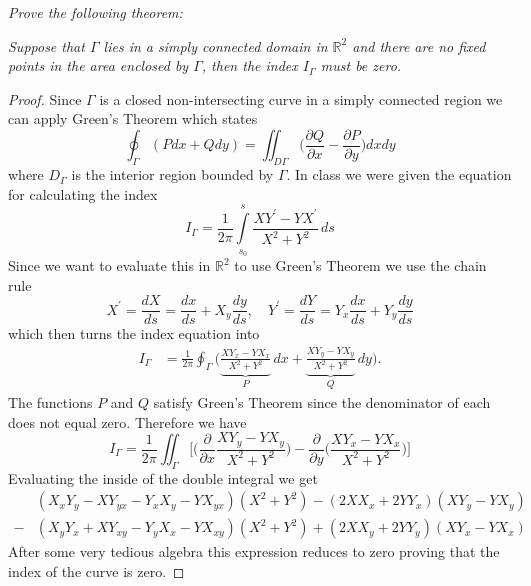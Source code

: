 \documentclass[12pt]{article}
\newcommand{\R}{\mathbb{R}}
\newenvironment{theorem}[2][]{\begin{trivlist}
\item[{\bfseries #1}\hskip \labelsep {\bfseries #2.}]}{\end{trivlist}}
\theoremstyle{remark}
\begin{document}
\textit{Prove the following theorem:}
\begin{theorem}{Theorem}
	\textit{Suppose that $\Gamma$ lies in a simply connected domain in $\R^2$ and there are no fixed points in the area enclosed by $\Gamma$, then the index $I_{\Gamma}$ must be zero.} 
\end{theorem}
\begin{proof}
Since $\Gamma$ is a closed non-intersecting curve in a simply connected region we can apply Green's Theorem which states
$$ \oint_\Gamma (P dx + Q dy) = \iint_{D\Gamma} \bigg(\frac{\partial Q}{\partial x} - \frac{\partial P}{\partial y}\bigg)dxdy $$
where $D_\Gamma$ is the interior region bounded by $\Gamma$. In class we were given the equation for calculating the index
$$ I_\Gamma = \frac{1}{2\pi}\int\limits_{s_0}^s \frac{XY^\prime - YX^\prime}{X^2 + Y^2} \, ds $$
Since we want to evaluate this in $\mathbb{R}^2$ to use Green's Theorem we use the chain rule
$$ X^\prime = \frac{dX}{ds} = \frac{dx}{ds} + X_y\frac{dy}{ds}, \quad Y^\prime = \frac{dY}{ds} = Y_x\frac{dx}{ds} + Y_y\frac{dy}{ds} $$
which then turns the index equation into
\begin{align*}
I_\Gamma & = \frac{1}{2\pi}\oint_\Gamma\bigg(\underbrace{\frac{XY_x - YX_x}{X^2 + Y^2}}_{P}\,dx + \underbrace{\frac{XY_y - YX_y}{X^2 + Y^2}}_{Q}\,dy\bigg).
\end{align*}
The functions $P$ and $Q$ satisfy Green's Theorem since the denominator of each does not equal zero. Therefore we have 
$$ I_\Gamma = \frac{1}{2\pi}\iint_\Gamma\bigg[\bigg(\frac{\partial}{\partial x}\frac{XY_y - YX_y}{X^2 + Y^2}\bigg) - \frac{\partial}{\partial y}\bigg(\frac{XY_x - YX_x}{X^2 + Y^2}\bigg)\bigg] $$
Evaluating the inside of the double integral we get
\begin{align*}
	& (X_xY_y - XY_{yx} - Y_xX_y - YX_{yx})(X^2 + Y^2) - (2XX_x + 2YY_x)(XY_y - YX_y) \\
	- & (X_yY_x + XY_{xy} - Y_yX_x - YX_{xy})(X^2 + Y^2) + (2XX_y + 2YY_y)(XY_x - YX_x)
\end{align*} 
After some very tedious algebra this expression reduces to zero proving that the index of the curve is zero.
\end{proof}
\end{document}
